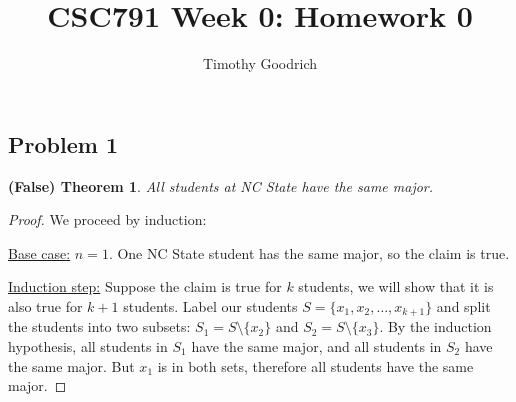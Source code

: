 \documentclass{article}
\title{CSC791 Week 0: Homework 0}
\author{Timothy Goodrich}
\newtheorem{theorem}{(False) Theorem}
\begin{document}
\maketitle

\subsection*{Problem 1}
\begin{theorem}
All students at NC State have the same major.
\end{theorem}

\begin{proof}
We proceed by induction:

\noindent\underline{Base case:} $n = 1$. One NC State student has the same major, so the claim is true.

\noindent\underline{Induction step:} Suppose the claim is true for $k$ students, we will show that it is also true for $k+1$ students. Label our students $S = \{x_1, x_2, \dots, x_{k+1}\}$ and split the students into two subsets: $S_1 = S \setminus \{x_2\}$ and $S_2 = S \setminus \{x_3\}$. By the induction hypothesis, all students in $S_1$ have the same major, and all students in $S_2$ have the same major. But $x_1$ is in both sets, therefore all students have the same major.
\end{proof}
\end{document}
